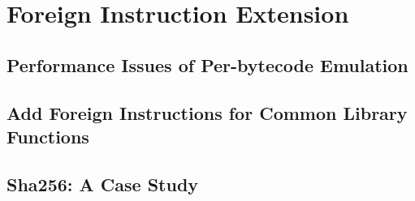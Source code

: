 \section{Foreign Instruction Extension}
\subsection{Performance Issues of Per-bytecode Emulation}
\subsection{Add Foreign Instructions for Common Library Functions}
\subsection{Sha256: A Case Study} 